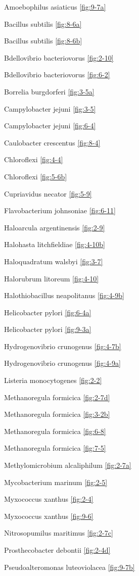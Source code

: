 \documentclass[]{tufte-book}
\begin{document}
Amoebophilus asiaticus \ref{fig:9-7a}

Bacillus subtilis \ref{fig:8-6a}

Bacillus subtilis \ref{fig:8-6b}

Bdellovibrio bacteriovorus \ref{fig:2-10}

Bdellovibrio bacteriovorus \ref{fig:6-2}

Borrelia burgdorferi \ref{fig:3-5a}

Campylobacter jejuni \ref{fig:3-5}

Campylobacter jejuni \ref{fig:6-4}

Caulobacter crescentus \ref{fig:8-4}

Chloroflexi \ref{fig:4-4}

Chloroflexi \ref{fig:5-6b}

Cupriavidus necator \ref{fig:5-9}

Flavobacterium johnsoniae \ref{fig:6-11}

Haloarcula argentinensis \ref{fig:2-9}

Halohasta litchfieldiae \ref{fig:4-10b}

Haloquadratum walsbyi \ref{fig:3-7}

Halorubrum litoreum \ref{fig:4-10}

Halothiobacillus neapolitanus \ref{fig:4-9b}

Helicobacter pylori \ref{fig:6-4a}

Helicobacter pylori \ref{fig:9-3a}

Hydrogenovibrio crunogenus \ref{fig:4-7b}

Hydrogenovibrio crunogenus \ref{fig:4-9a}

Listeria monocytogenes \ref{fig:2-2}

Methanoregula formicica \ref{fig:2-7d}

Methanoregula formicica \ref{fig:3-2b}

Methanoregula formicica \ref{fig:6-8}

Methanoregula formicica \ref{fig:7-5}

Methylomicrobium alcaliphilum \ref{fig:2-7a}

Mycobacterium marinum \ref{fig:2-5}

Myxococcus xanthus \ref{fig:2-4}

Myxococcus xanthus \ref{fig:9-6}

Nitrosopumilus maritimus \ref{fig:2-7c}

Prosthecobacter debontii \ref{fig:2-4d}

Pseudoalteromonas luteoviolacea \ref{fig:9-7b}
\end{document}
